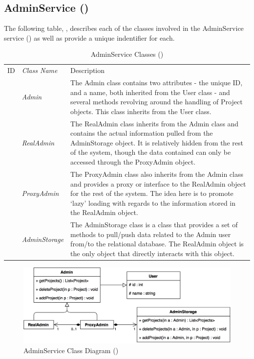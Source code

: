 \documentclass[12pt,letterpaper]{article}
\begin{document}
\subsection{AdminService ()}

The following table, , describes each of the classes involved in the AdminService service () as well as provide a unique indentifier for each.

\begin{table}[H]
	\caption{AdminService Classes ()} 
	\begin{tabu} to 
	    \tableheader{}ID & Class Name & Description \\
		 & Admin & The Admin class contains two attributes - the unique ID, and a name, both inherited from the User class - and several methods revolving around the handling of Project objects. This class inherits from the User class. \\
		 & RealAdmin & The RealAdmin class inherits from the Admin class and contains the actual information pulled from the AdminStorage object. It is relatively hidden from the rest of the system, though the data contained can only be accessed through the ProxyAdmin object. \\
		 & ProxyAdmin & The ProxyAdmin class also inherits from the Admin class and provides a proxy or interface to the RealAdmin object for the rest of the system. The idea here is to promote `lazy' loading with regards to the information stored in the RealAdmin object.\\
		 & AdminStorage & The AdminStorage class is a class that provides a set of methods to pull/push data related to the Admin user from/to the relational database. The RealAdmin object is the only object that directly interacts with this object.\\
	\end{tabu}
\end{table}

\begin{figure}[H]
	\centering{}
	\includegraphics[scale=0.37]{imgs/d3/interfaces/admin.png}
	\caption{AdminService Class Diagram ()}
\end{figure}
\end{document}
